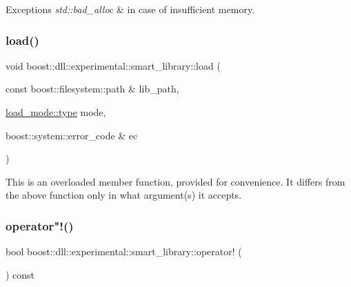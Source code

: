 \begin{DoxyExceptions}{Exceptions}
{\em std\+::bad\+\_\+alloc} & in case of insufficient memory. \\
\hline
\end{DoxyExceptions}
\mbox{\label{a01712_a08af5d7544f4fa43985254c3924df3bd}} 
\subsubsection{\texorpdfstring{load()}{load()}\hspace{0.1cm}{\footnotesize\ttfamily [3/3]}}
{\footnotesize\ttfamily void boost\+::dll\+::experimental\+::smart\+\_\+library\+::load (\begin{DoxyParamCaption}\item[{const boost\+::filesystem\+::path \&}]{lib\+\_\+path,  }\item[{\hyperlink{a00272_a1918a602801479bc0bade54ff5665129}{load\+\_\+mode\+::type}}]{mode,  }\item[{boost\+::system\+::error\+\_\+code \&}]{ec }\end{DoxyParamCaption})\hspace{0.3cm}{\ttfamily [inline]}}





This is an overloaded member function, provided for convenience. It differs from the above function only in what argument(s) it accepts. \mbox{\label{a01712_a57ba8c8f9d05415bb4698fa05bdd9153}} 
\subsubsection{\texorpdfstring{operator"!()}{operator!()}}
{\footnotesize\ttfamily bool boost\+::dll\+::experimental\+::smart\+\_\+library\+::operator! (\begin{DoxyParamCaption}{ }\end{DoxyParamCaption}) const\hspace{0.3cm}{\ttfamily [inline]}}





